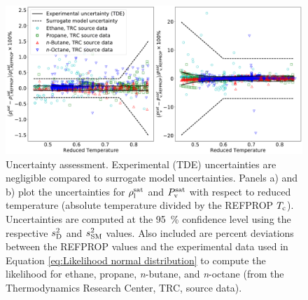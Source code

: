 \documentclass[preprint,letterpaper,floatfix,citeautoscript,aip,jcp]{revtex4-1}
\begin{document}
\begin{figure}[htb!]
	\centering
	\includegraphics[width=6.4in]{Error_model_alkanes}
	\caption{Uncertainty assessment. Experimental (TDE) uncertainties are negligible compared to surrogate model uncertainties. Panels a) and b) plot the uncertainties for $\rho_{\rm l}^{\rm sat}$ and $P_{\rm v}^{\rm sat}$ with respect to reduced temperature (absolute temperature divided by the REFPROP $T_{\rm c}$). Uncertainties are computed at the 95~\% confidence level using the respective $s^2_{\rm D}$ and $s^2_{\rm SM}$ values. Also included are percent deviations between the REFPROP values \cite{LEMMON-RP91,Ethane2006,Propane2009,Butane2006,Beckmueller2017} and the experimental data used in Equation \ref{eq:Likelihood normal distribution} to compute the likelihood for ethane, propane, \textit{n}-butane, and \textit{n}-octane (from the Thermodynamics Research Center, TRC, source data). \cite{TDE} }
	\label{fig:Error_model}
\end{figure}

\end{document}
